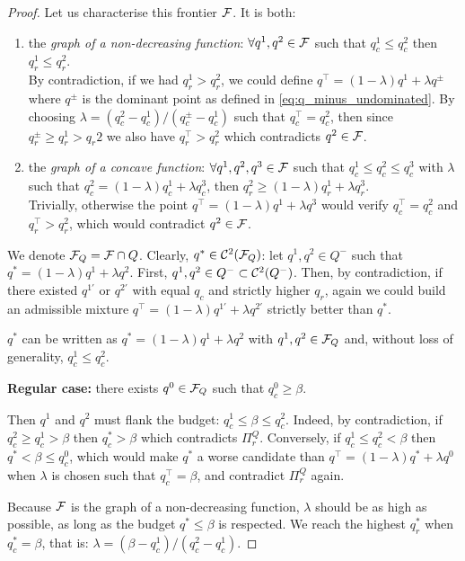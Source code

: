 \begin{subappendices}
\begin{proof}
	
	Let us characterise this frontier $\mathcal{F}$. It is both:
	\begin{enumerate}
		\item the \emph{graph of a non-decreasing function}: $\forall q^1, q^2\in\mathcal{F}$ such that $q_c^1\leq q_c^2$ then $q_r^1\leq q_r^2$.\\
		By contradiction, if we had $q_r^1 > q_r^2$, we could define $q^\top = (1-\lambda)q^1 + \lambda q^\pm$ where $q^\pm$ is the dominant point as defined in \eqref{eq:q_minus_undominated}. By choosing $\lambda=(q^2_c-q^1_c)/(q^\pm_c-q^1_c)$ such that $q^\top_c = q_c^2$, then since $q_r^\pm \geq q_r^1 > q_r 2$ we also have $q^\top_r > q_r^2$ which contradicts $q^2\in\mathcal{F}$.
		\item the \emph{graph of a concave function}: $\forall q^1, q^2, q^3\in\mathcal{F}$ such that $q_c^1\leq q_c^2 \leq q_c^3$ with $\lambda$ such that $q^2_c = (1-\lambda)q^1_c + \lambda q^3_c$, then $q_r^2 \geq (1-\lambda)q_r^1 + \lambda q_r^3$.\\
		Trivially, otherwise the point $q^\top = (1-\lambda)q^1 + \lambda q^3$ would verify $q^\top_c=q^2_c$ and $q^\top_r > q^2_r$, which would contradict $q^2 \in\mathcal{F}$.
	\end{enumerate}
	
	We denote $\mathcal{F}_Q = \mathcal{F} \cap Q$. Clearly, $q^*\in\mathcal{C}^2(\mathcal{F}_Q)$: let $q^1, q^2\in Q^-$ such that $q^* = (1-\lambda)q^1  + \lambda q^2$. First, $q^1, q^2\in Q^-\subset\mathcal{C}^2(Q^-)$. Then, by contradiction, if there existed $q^{1'}$ or $q^{2'}$ with equal $q_c$ and strictly higher $q_r$, again we could build an admissible mixture $q^{\top}=(1-\lambda)q^{1'}  + \lambda q^{2'}$ strictly better than $q^*$.
	
	$q^*$ can be written as $q^* = (1-\lambda)q^1  + \lambda q^2$ with $q^1, q^2\in\mathcal{F}_Q$ and, without loss of generality, $q^1_c \leq q^2_c$.
	
	\textbf{Regular case:} there exists $q^0\in\mathcal{F}_Q$ such that $q^0_c \geq \beta$.
	
	Then $q^1$ and $q^2$ must flank the budget: $q_c^1 \leq \beta \leq q_c^2$. Indeed, by contradiction, if $q_c^2 \geq q_c^1 > \beta$ then $q_c^* > \beta$ which contradicts $\Pi_r^Q$. Conversely, if $q_c^1 \leq q_c^2 < \beta$ then $q^* < \beta \leq q^0_c$, which would make $q^*$ a worse candidate than $q^\top=(1-\lambda)q^* + \lambda q^0$ when $\lambda$ is chosen such that $q_c^\top=\beta$, and contradict $\Pi_r^Q$ again.
	
	Because $\mathcal{F}$ is the graph of a non-decreasing function, $\lambda$ should be as high as possible, as long as the budget $q^*\leq\beta$ is respected. We reach the highest $q_r^*$ when $q^*_c=\beta$, that is: $\lambda=(\beta-q_c^1)/(q_c^2-q_c^1)$.
	

\end{proof}
\end{subappendices}
